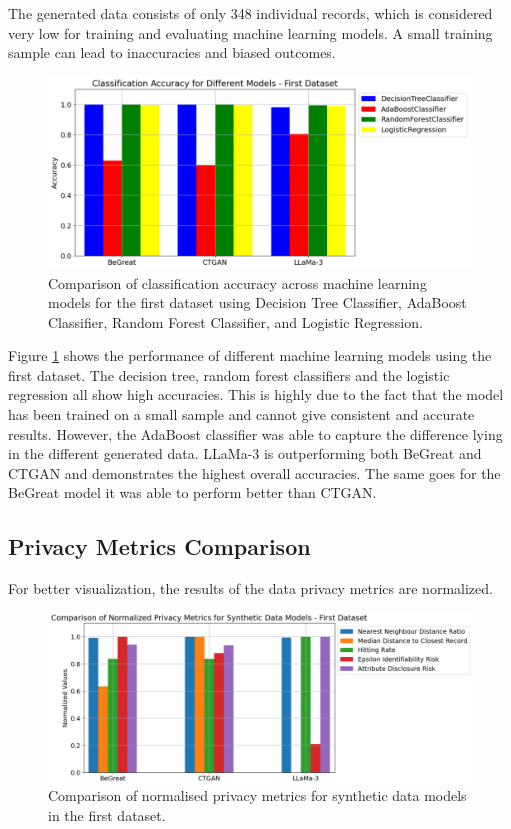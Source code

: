 The generated data consists of only 348 individual records, which is considered very low for training and evaluating machine learning models. A small training sample can lead to inaccuracies and biased outcomes. 


\begin{figure}[H]
    \centering
        \centering
        \includegraphics[width=1\textwidth]{images/dataset1_ml.png}
        \caption{Comparison of classification accuracy across machine learning models for the first dataset using Decision Tree Classifier, AdaBoost Classifier, Random Forest Classifier, and Logistic Regression.}
        \label{fig:dataset1_ml}
\end{figure}

Figure \ref{fig:dataset1_ml} shows the performance of different machine learning models using the first dataset. The decision tree, random forest classifiers and the logistic regression all show high accuracies. This is highly due to the fact that the model has been trained on a small sample and cannot give consistent and accurate results. However, the AdaBoost classifier was able to capture the difference lying in the different generated data. LLaMa-3 is outperforming both BeGreat and CTGAN and demonstrates the highest overall accuracies. The same goes for the BeGreat model it was able to perform better than CTGAN.



\subsection{Privacy Metrics Comparison}

For better visualization, the results of the data privacy metrics are normalized. 


\begin{figure}[H]
    \centering
        \centering
        \includegraphics[width=1\textwidth]{images/dataset1_privacy.png}
        \caption{Comparison of normalised privacy metrics for synthetic data models in the first dataset.}
        \label{fig:dataset1_privacy}
\end{figure}

